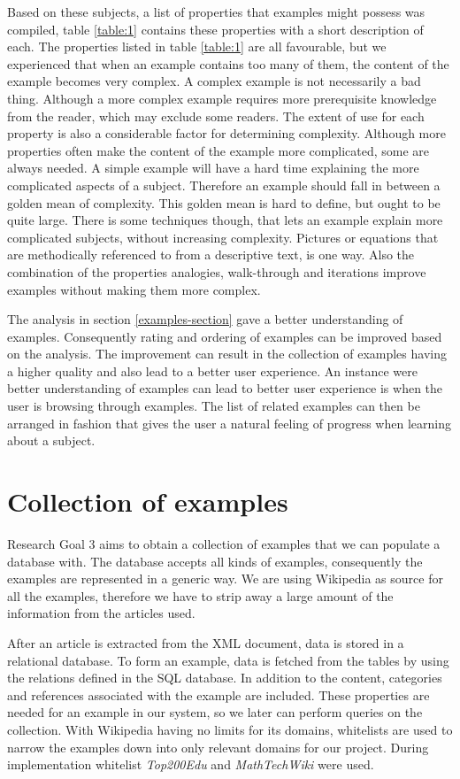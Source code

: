 Based on these subjects, a list of properties that examples might possess was compiled, table \ref{table:1} contains these properties with a short description of each. The properties listed in table \ref{table:1} are all favourable, but we experienced that when an example contains too many of them, the content of the example becomes very complex. A complex example is not necessarily a bad thing. Although a more complex example requires more prerequisite knowledge from the reader, which may exclude some readers. The extent of use for each property is also a considerable factor for determining complexity. Although more properties often make the content of the example more complicated, some are always needed. A simple example will have a hard time explaining the more complicated aspects of a subject. Therefore an example should fall in between a golden mean of complexity. This golden mean is hard to define, but ought to be quite large. There is some techniques though, that lets an example explain more complicated subjects, without increasing complexity. Pictures or equations that are methodically referenced to from a descriptive text, is one way. Also the combination of the properties analogies, walk-through and iterations improve examples without making them more complex. 

The analysis in section \ref{examples-section} gave a better understanding of examples. Consequently rating and ordering of examples can be improved based on the analysis. 
The improvement can result in the collection of examples having a higher quality and also lead to a better user experience. An instance were better understanding of examples can lead to better user experience is when the user is browsing through examples. The list of related examples can then be arranged in fashion that gives the user a natural feeling of progress when learning about a subject.


\section{Collection of examples} \label{5:exampleCollection}
Research Goal 3 aims to obtain a collection of examples that we can populate a database with. The database accepts all kinds of examples, consequently the examples are represented in a generic way. We are using Wikipedia as source for all the examples, therefore we have to strip away a large amount of the information from the articles used. 

After an article is extracted from the XML document, data is stored in a relational database. To form an example, data is fetched from the tables by using the relations defined in the SQL database. In addition to the content, categories and references associated with the example are included. These properties are needed for an example in our system, so we later can perform queries on the collection. With Wikipedia having no limits for its domains, whitelists are used to narrow the examples down into only relevant domains for our project. During implementation whitelist \textit{Top200Edu} and \textit{MathTechWiki} were used.

